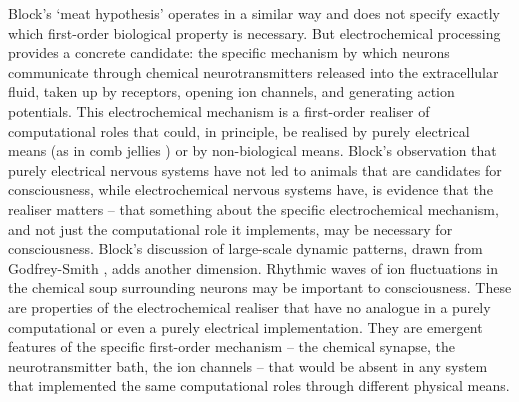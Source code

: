 \documentclass[11pt, a4paper, onecolumn, gdm]{google}
\begin{document}
Block's `meat hypothesis' operates in a similar way and does not specify exactly which first-order biological property is necessary.
But electrochemical processing provides a concrete candidate: the specific mechanism by which neurons communicate through chemical neurotransmitters released into the extracellular fluid, taken up by receptors, opening ion channels, and generating action potentials.
This electrochemical mechanism is a first-order realiser of computational roles that could, in principle, be realised by purely electrical means (as in comb jellies \citep{burkhardt2023}) or by non-biological means.
Block's observation that purely electrical nervous systems have not led to animals that are candidates for consciousness, while electrochemical nervous systems have, is evidence that the realiser matters -- that something about the specific electrochemical mechanism, and not just the computational role it implements, may be necessary for consciousness.
Block's discussion of large-scale dynamic patterns, drawn from Godfrey-Smith \citep{godfreysmith2024}, adds another dimension.
Rhythmic waves of ion fluctuations in the chemical soup surrounding neurons may be important to consciousness.
These are properties of the electrochemical realiser that have no analogue in a purely computational or even a purely electrical implementation.
They are emergent features of the specific first-order mechanism -- the chemical synapse, the neurotransmitter bath, the ion channels -- that would be absent in any system that implemented the same computational roles through different physical means.
\end{document}
